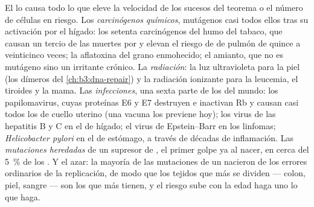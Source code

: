 \begin{proposition}[Causas]\label{prop:b3:cancer-biology:causes}
El  lo causa todo lo que eleve la velocidad de los sucesos del
teorema o el número de células en riesgo. Los \emph{carcinógenos
químicos}, mutágenos casi todos ellos tras su activación por el hígado:
los setenta carcinógenos del humo del tabaco, que causan un tercio de las
muertes por  y elevan el riesgo de  de pulmón de quince a
veinticinco veces; la aflatoxina del grano enmohecido; el amianto, que no
es mutágeno sino un irritante crónico. La \emph{radiación}: la luz
ultravioleta para la piel (los dímeros del \cref{ch:b3:dna-repair}) y la
radiación ionizante para la leucemia, el tiroides y la mama. Las
\emph{infecciones}, una sexta parte de los  del mundo: los
papilomavirus, cuyas proteínas E6 y E7 destruyen  e inactivan Rb y
causan casi todos los  de cuello uterino (una vacuna los previene
hoy); los virus de las hepatitis B y C en el  de hígado; el virus
de Epstein--Barr en los linfomas; \emph{Helicobacter pylori} en el 
de estómago, a través de décadas de inflamación. Las \emph{mutaciones
heredadas} de un supresor de , el primer golpe ya al nacer, en
cerca del \qty{5}{\%} de los . Y el azar: la mayoría de las
mutaciones de un  nacieron de los errores ordinarios de la
replicación, de modo que los tejidos que más se dividen --- colon, piel,
sangre --- son los que más  tienen, y el riesgo sube con la edad
haga uno lo que haga.
\end{proposition}

